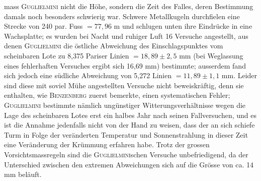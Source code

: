 \noindent mass \textsc{Guglielmini} nicht die Höhe, sondern die Zeit des Falles, deren Bestimmung
damals noch besonders schwierig war. Schwere Metallkugeln durchfielen
eine Strecke von 240 par. Fuss $=77{,}96$ m und schlugen unten ihre
Eindrücke in eine Wachsplatte; es wurden bei Nacht und ruhiger Luft 16
Versuche angestellt, aus denen \textsc{Guglielmini} die östliche Abweichung des Einschlagspunktes
vom scheinbaren Lote zu 8,375 Pariser Linien $=18{,}89\pm2{,}5$ mm
(bei Weglassung eines fehlerhaften Versuches ergibt sich 16,69 mm) bestimmte;
ausserdem fand sich jedoch eine südliche Abweichung von 5,272 Linien
$=11{,}89\pm1{,}1$ mm. Leider sind diese mit soviel Mühe angestellten Versuche
nicht beweiskräftig, denn sie enthalten, wie \textsc{Benzenberg} zuerst bemerkte, einen
systematischen Fehler; \textsc{Guglielmini} bestimmte nämlich ungünstiger Witterungsverhältnisse
wegen die Lage des scheinbaren Lotes erst ein halbes Jahr nach
seinen Fallversuchen, und es ist die Annahme jedenfalls nicht von der Hand
zu weisen, dass der an sich schiefe Turm in Folge der veränderten Temperatur
und Sonnenstrahlung in dieser Zeit eine Veränderung der Krümmung
erfahren habe. Trotz der grossen Vorsichtsmassregeln sind die \textsc{Guglielmini}schen
Versuche unbefriedigend, da der Unterschied zwischen den extremen Abweichungen
sich auf die Grösse von ca. 14 mm beläuft.

